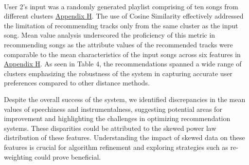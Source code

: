 \documentclass{article}
\begin{document}
\begin{table} [ht]
\\[1ex]
\caption{Recommendations for User 2. Cluster numbers mentioned in '[]' after song title}
\label{tab:template3}
\end{table}

User 2's input was a randomly generated playlist comprising of ten songs from different clusters \hyperref[app:RecSysOP]{{Appendix H}}. The use of Cosine Similarity effectively addressed the limitation of recommending tracks only from the same cluster as the input song. Mean value analysis underscored the proficiency of this metric in recommending songs as the attribute values of the recommended tracks were comparable to the mean characteristics of the input songs across six features in \hyperref[app:RecSysOP]{{Appendix H}}. As seen in Table 4, the recommendations spanned a wide range of clusters emphasizing the robustness of the system in capturing accurate user preferences compared to other distance methods.

Despite the overall success of the system, we identified discrepancies in the mean values of speechiness and instrumentalness, suggesting potential areas for improvement and highlighting the challenges in optimizing recommendation systems. These disparities could be attributed to the skewed power law distribution of these features. Understanding the impact of skewed data on these features is crucial for algorithm refinement and exploring strategies such as re-weighting could prove beneficial.
\end{document}
